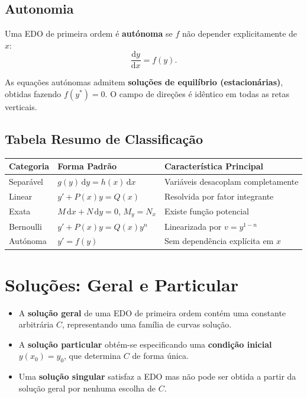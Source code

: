 \documentclass[12pt, a4paper]{article}
\newcommand{\dd}{\mathrm{d}}
\begin{document}
\subsection{Autonomia}

\begin{defbox}
  Uma EDO de primeira ordem é \textbf{autónoma} se $f$ não depender explicitamente de $x$:
  \[
    \frac{\dd y}{\dd x} = f(y).
  \]
\end{defbox}

As equações autónomas admitem \textbf{soluções de equilíbrio (estacionárias)}, obtidas
fazendo $f(y^{*})=0$. O campo de direções é idêntico em todas as retas verticais.

\subsection{Tabela Resumo de Classificação}

\begin{center}
\renewcommand{\arraystretch}{1.3}
\begin{tabularx}{0.92\linewidth}{X X X}
  \toprule
  \textbf{Categoria} & \textbf{Forma Padrão} & \textbf{Característica Principal} \\
  \midrule
  Separável    & $g(y)\,\dd y = h(x)\,\dd x$          & Variáveis desacoplam completamente \\
  Linear       & $y' + P(x)y = Q(x)$                  & Resolvida por fator integrante \\
  Exata        & $M\,\dd x + N\,\dd y = 0$, $M_y=N_x$ & Existe função potencial \\
  Bernoulli    & $y' + P(x)y = Q(x)y^n$               & Linearizada por $v=y^{1-n}$ \\
  Autónoma     & $y' = f(y)$                           & Sem dependência explícita em $x$ \\
  \bottomrule
\end{tabularx}
\end{center}

\section{Soluções: Geral e Particular}
\label{sec:solutions}

\begin{defbox}
  \begin{itemize}
    \item A \textbf{solução geral} de uma EDO de primeira ordem contém uma constante
          arbitrária $C$, representando uma família de curvas solução.
    \item A \textbf{solução particular} obtém-se especificando uma
          \textbf{condição inicial} $y(x_0) = y_0$, que determina $C$ de forma única.
    \item Uma \textbf{solução singular} satisfaz a EDO mas não pode ser obtida a partir
          da solução geral por nenhuma escolha de $C$.
  \end{itemize}
\end{defbox}
\end{document}

